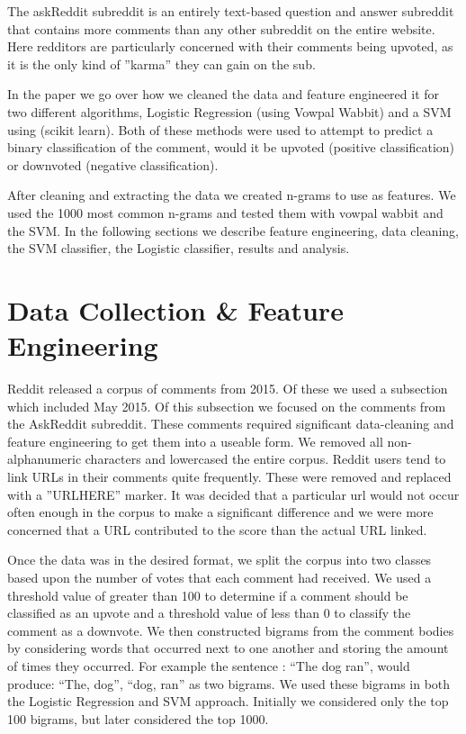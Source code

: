 \documentclass{article}
\begin{document}
The askReddit subreddit is an entirely text-based question and answer subreddit that contains more comments than any other subreddit on the entire website. Here redditors are particularly concerned with their comments being upvoted, as it is the only kind of ''karma'' they can gain on the sub. 

In the paper we go over how we cleaned the data and feature engineered it for two different algorithms, Logistic Regression (using Vowpal Wabbit) and a SVM using (scikit learn). Both of these methods were used to attempt to predict a binary classification of the comment, would it be upvoted (positive classification) or downvoted (negative classification). 

After cleaning and extracting the data we created n-grams to use as features. We used the 1000 most common n-grams and tested them with vowpal wabbit and the SVM. In the following sections we describe feature engineering, data cleaning, the SVM classifier, the Logistic classifier, results and analysis. 

\section{Data Collection \& Feature Engineering}
Reddit released a corpus of comments from 2015. Of these we used a subsection which included May 2015. Of this subsection we focused on the comments from the AskReddit subreddit. These comments required significant data-cleaning and feature engineering to get them into a useable form. We removed all non-alphanumeric characters and lowercased the entire corpus. Reddit users tend to link URLs in their comments quite frequently. These were removed and replaced with a ''URLHERE'' marker. It was decided that a particular url would not occur often enough in the corpus to make a significant difference and we were more concerned that a URL contributed to the score than the actual URL linked. 


Once the data was in the desired format, we split the corpus into two classes based upon the number of votes that each comment had received.  We used a threshold value of greater than 100 to determine if a comment should be classified as an upvote and a threshold value of less than 0 to classify the comment as a downvote. We then constructed bigrams from the comment bodies by considering words that occurred next to one another and storing the amount of times they occurred. For example the sentence : ``The dog ran'', would produce: ``The, dog'', ``dog, ran'' as two bigrams. We used these bigrams in both the Logistic Regression and SVM approach. Initially we considered only the top 100 bigrams, but later considered the top 1000. 
\end{document}
